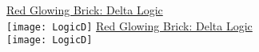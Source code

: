 \documentclass[white]{GL2020}
\begin{document}
\name{\wLogicDelta{}}

\vspace*{0.5cm}
\begin{center}
{\LARGE \underline{Red Glowing Brick: Delta Logic}}\\
\vspace{0.5cm}
\texttt{[image: LogicD]}
\vfill
{\LARGE \underline{Red Glowing Brick: Delta Logic}}\\
\vspace{0.5cm}
\texttt{[image: LogicD]}
\end{center}
\end{document}
